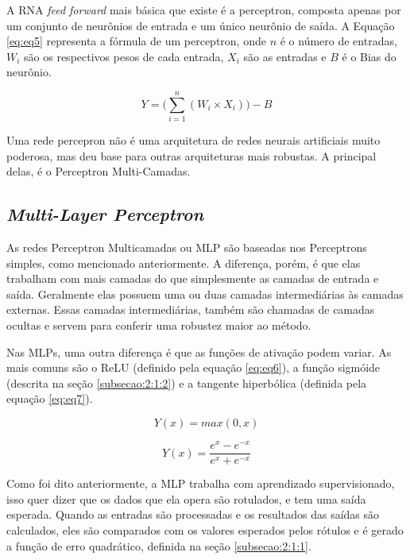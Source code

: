 A \ac{RNA} \textit{feed forward} mais básica que existe é a perceptron, composta apenas por um conjunto de neurônios de entrada e um único neurônio de saída. A Equação \ref{eq:eq5} representa a fórmula de um perceptron, onde $n$ é o número de entradas, $W_i$ são os respectivos pesos de cada entrada, $X_i$ são as entradas e $B$ é o Bias do neurônio.

\begin{equation}
Y=\Big(\sum_{i=1}^{n}{(W_i \times X_i)}\Big) - B
\label{eq:eq5}
\end{equation}

Uma rede percepron não é uma arquitetura de redes neurais artificiais muito poderosa, mas deu base para outras arquiteturas mais robustas. A principal delas, é o Perceptron Multi-Camadas.

\subsection{\textit{Multi-Layer Perceptron}}
\label{subsecao:2:2:2}


As redes Perceptron Multicamadas ou \ac{MLP} são baseadas nos Perceptrons simples, como mencionado anteriormente. A diferença, porém, é que elas trabalham com mais camadas do que simplesmente as camadas de entrada e saída. Geralmente elas possuem uma ou duas camadas intermediárias às camadas externas. Essas camadas intermediárias, também são chamadas de camadas ocultas e servem para conferir uma robustez maior ao método.

Nas \ac{MLP}s, uma outra diferença é que as funções de ativação podem variar. As mais comuns são o \ac{ReLU} (definido pela equação \ref{eq:eq6}), a função sigmóide (descrita na seção \ref{subsecao:2:1:2}) e a tangente hiperbólica (definida pela equação \ref{eq:eq7}).

\begin{equation}
	Y(x) = max(0, x)
	\label{eq:eq6}
\end{equation}

\begin{equation}
	Y(x) = \dfrac{e^x - e^{-x}}{e^x+e^{-x}}
	\label{eq:eq7}
\end{equation}

Como foi dito anteriormente, a \ac{MLP} trabalha com aprendizado supervisionado, isso quer dizer que os dados que ela opera são rotulados, e tem uma saída esperada. Quando as entradas são processadas e os resultados das saídas são calculados, eles são comparados com os valores esperados pelos rótulos e é gerado a função de erro quadrático, definida na seção \ref{subsecao:2:1:1}.

